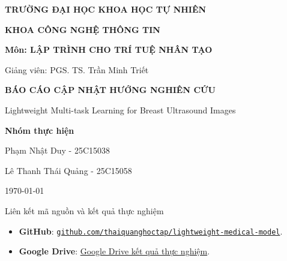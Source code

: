 \documentclass[12pt,a4paper]{article}
\newcommand{\githubrepo}{\href{https://github.com/thaiquanghoctap/lightweight-medical-model}{\texttt{github.com/thaiquanghoctap/lightweight-medical-model}}}
\newcommand{\resultdrive}{\href{https://drive.google.com/drive/folders/1ZFqnT5X12mwOahLquEp8JkauidLAaHGb}{Google Drive kết quả thực nghiệm}}
\begin{document}

\begin{titlepage}
\thispagestyle{empty}
\centering

{\Large\bfseries TRƯỜNG ĐẠI HỌC KHOA HỌC TỰ NHIÊN\par}
\vspace{0.35cm}
{\large\bfseries KHOA CÔNG NGHỆ THÔNG TIN\par}

\vspace{2.4cm}

{\large\bfseries Môn: LẬP TRÌNH CHO TRÍ TUỆ NHÂN TẠO\par}
\vspace{0.35cm}
{\large Giảng viên: PGS. TS. Trần Minh Triết\par}

\vspace{2.4cm}

{\LARGE\bfseries\textcolor{mainblue}{BÁO CÁO CẬP NHẬT HƯỚNG NGHIÊN CỨU}\par}
\vspace{0.45cm}
{\Large Lightweight Multi-task Learning for Breast Ultrasound Images\par}

\vfill

{\large\bfseries Nhóm thực hiện\par}
\vspace{0.35cm}
{\large Phạm Nhật Duy - 25C15038\par}
{\large Lê Thanh Thái Quảng - 25C15058\par}

\vfill

{\large \today\par}
\end{titlepage}


\begin{methodbox}{Liên kết mã nguồn và kết quả thực nghiệm}
\begin{itemize}
    \item \textbf{GitHub}: \githubrepo.
    \item \textbf{Google Drive}: \resultdrive.
\end{itemize}
\end{methodbox}
\end{document}
